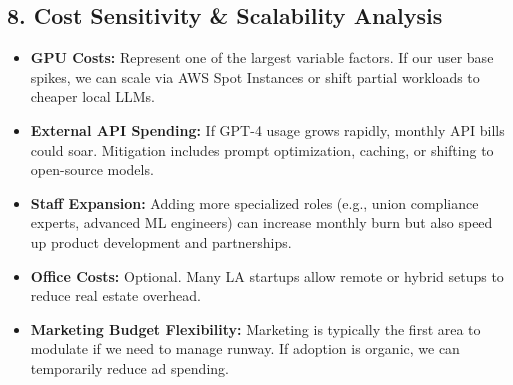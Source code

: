\documentclass[11pt]{article}
\begin{document}
\begin{table}[H]
\centering
{}
\caption{Illustrative Monthly Burn Rate (Year 1)}
\end{table}

\subsection{8. Cost Sensitivity \& Scalability Analysis}

\begin{itemize}
    \item \textbf{GPU Costs:} Represent one of the largest variable factors. If our user base spikes, we can scale via AWS Spot Instances or shift partial workloads to cheaper local LLMs.
    \item \textbf{External API Spending:} If GPT-4 usage grows rapidly, monthly API bills could soar. Mitigation includes prompt optimization, caching, or shifting to open-source models.
    \item \textbf{Staff Expansion:} Adding more specialized roles (e.g., union compliance experts, advanced ML engineers) can increase monthly burn but also speed up product development and partnerships.
    \item \textbf{Office Costs:} Optional. Many LA startups allow remote or hybrid setups to reduce real estate overhead.
    \item \textbf{Marketing Budget Flexibility:} Marketing is typically the first area to modulate if we need to manage runway. If adoption is organic, we can temporarily reduce ad spending.
\end{itemize}
\end{document}
